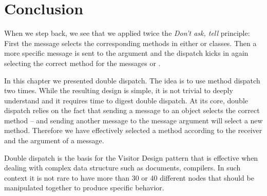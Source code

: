 \documentclass[10pt,twoside,english]{_support/latex/sbabook/sbabook}
\begin{document}
\section{Conclusion}
When we step back, we see that we applied twice the \textit{Don't ask, tell} principle:
First the message \textcode{+} selects the corresponding methods in either  or  classes. Then a more specific message is sent to the argument and the dispatch kicks in again selecting the correct method for the messages  or .

In this chapter we presented double dispatch. The idea is to use method dispatch two times.
While the resulting design is simple, it is not trivial to deeply understand and it requires time to digest double dispatch. 
At its core, double dispatch relies on the fact that sending a message to an object selects the correct method -- and 
sending another message to the message argument will select a new method. Therefore we have effectively selected a method according to the receiver and the argument of a message.

Double dispatch is the basis for the Visitor Design pattern that is effective when dealing with complex data structure such as documents, compilers. In such context it is not rare to have more than 30 or 40 different nodes that should be manipulated together to produce specific behavior. 


\backmatter



\end{document}
